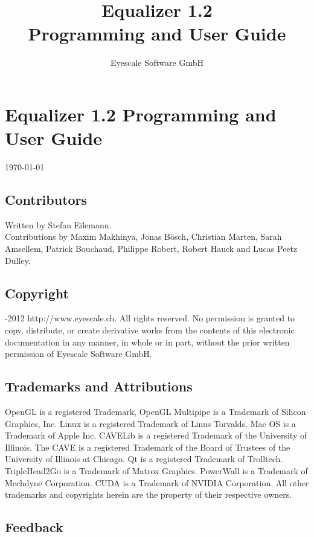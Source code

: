 \documentclass[10pt,a4]{scrartcl}
\title{\vspace{7cm}
Equalizer 1.2\\Programming and User Guide}
\author{Eyescale Software GmbH}
\begin{document}
\pagestyle{empty}
\maketitle
\thispagestyle{empty}

\clearpage

\lstset{language=C++}
\section*{Equalizer 1.2 Programming and User Guide}
\today
\subsection*{Contributors}

Written by Stefan Eilemann.\\ 
Contributions by Maxim Makhinya, Jonas B\"osch, Christian Marten, Sarah
Amsellem, Patrick Bouchaud, Philippe Robert, Robert Hauck and Lucas Peetz
Dulley.

\subsection*{Copyright}

-2012 
{http://www.eyescale.ch}. All rights reserved. No permission is
granted to copy, distribute, or create derivative works from the
contents of this electronic documentation in any manner, in whole or in
part, without the prior written permission of Eyescale Software GmbH.

\subsection*{Trademarks and Attributions}

OpenGL is a registered Trademark, OpenGL Multipipe is a Trademark of
Silicon Graphics, Inc. Linux is a registered Trademark of Linus
Torvalds.  Mac OS is a Trademark of Apple Inc. CAVELib is a registered
Trademark of the University of Illinois. The CAVE is a registered
Trademark of the Board of Trustees of the University of Illinois at
Chicago. Qt is a registered Trademark of Trolltech. TripleHead2Go is a
Trademark of Matrox Graphics. PowerWall is a Trademark of Mechdyne
Corporation. CUDA is a Trademark of NVIDIA Corporation. All other
trademarks and copyrights herein are the property of their respective
owners.

\subsection*{Feedback}
\end{document}
